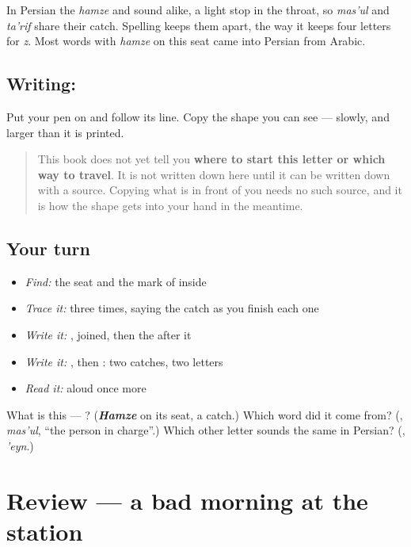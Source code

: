 In Persian the \emph{hamze} and \textbf{} sound alike, a light stop in the throat, so \emph{mas'ul} and \emph{ta'rif} share their catch. Spelling keeps them apart, the way it keeps four letters for \emph{z}. Most words with \emph{hamze} on this seat came into Persian from Arabic.

\subsection*{Writing: }
Put your pen on  and follow its line. Copy the shape you can see — slowly, and larger than it is printed.

\begin{quote}
This book does not yet tell you \textbf{where to start this letter or which way to travel}. It is not written down here until it can be written down with a source. Copying what is in front of you needs no such source, and it is how the shape gets into your hand in the meantime.
\end{quote}

\subsection*{Your turn}
\begin{itemize}
\raggedright
  \item \emph{Find:} the seat and the mark of  inside \textbf{}
  \item \emph{Trace it:}  three times, saying the catch as you finish each one
  \item \emph{Write it:} , joined, then the  after it
  \item \emph{Write it:} \textbf{}, then \textbf{}: two catches, two letters
  \item \emph{Read it:} \textbf{} aloud once more
\end{itemize}

\begin{tcolorbox}[breakable,colback=teal!4,colframe=teal!35!black,title={Before you move on}]
What is this — ? (\emph{\textbf{Hamze}} on its seat, a catch.) Which word did it come from? (\textbf{}, \emph{mas'ul}, \textquotedblleft{}the person in charge\textquotedblright{}.) Which other letter sounds the same in Persian? (\textbf{}, \emph{'eyn}.)
\end{tcolorbox}
\section[(review)]{Review — a bad morning at the station}

